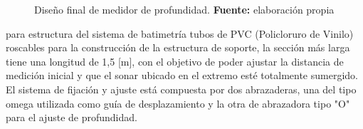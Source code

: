 \begin{figure}[ht]
\centering
{}
\caption{Dise\~no final de medidor de profundidad. \textbf{Fuente:} elaboración propia}
\label{fig:batimetro}
\end{figure}

para estructura del sistema de batimetr\'ia tubos de PVC (Policloruro de Vinilo) roscables para la construcci\'on de la estructura de soporte, la secci\'on m\'as larga tiene una longitud de 1,5 [m], con el objetivo de poder ajustar la distancia de medici\'on inicial y que el sonar ubicado en el extremo est\'e totalmente sumergido. El sistema de fijaci\'on y ajuste est\'a compuesta por dos abrazaderas, una del tipo omega utilizada como gu\'ia de desplazamiento y la otra de abrazadora tipo "O" para el ajuste de profundidad. 

